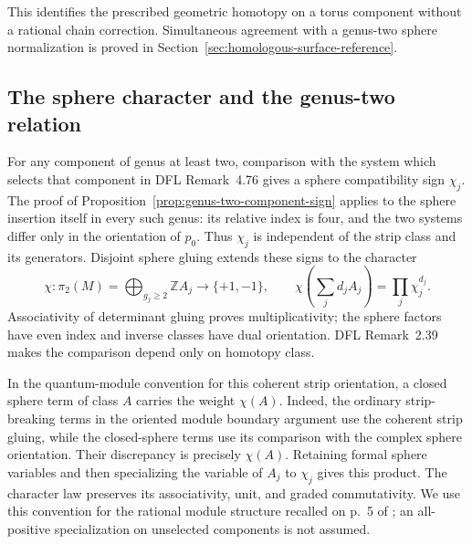 \documentclass[11pt]{amsart}
\theoremstyle{definition}
\theoremstyle{remark}
\theoremstyle{plain}
\begin{document}
This identifies the prescribed geometric homotopy on a
torus component without a rational chain correction.
Simultaneous agreement with a genus-two sphere normalization
is proved in Section~\ref{sec:homologous-surface-reference}.

\subsection{The sphere character and the genus-two relation}
\label{sec:sphere-character-quantum-relation}

For any component of genus at least two, comparison
with the system which selects that component in
DFL Remark~4.76 gives a sphere compatibility sign
$\chi_j$. The proof of
Proposition~\ref{prop:genus-two-component-sign}
applies to the sphere insertion itself in every
such genus: its relative index is four, and the
two systems differ only in the orientation of
$p_0$. Thus $\chi_j$ is independent of the strip
class and its generators. Disjoint sphere gluing
extends these signs to the character
\[
 \chi:\pi_2(M)=\bigoplus_{g_j\ge2}\mathbb Z A_j
      \longrightarrow\{+1,-1\},\qquad
 \chi\!\left(\sum_j d_j A_j\right)=\prod_j\chi_j^{d_j}.
\]
Associativity of determinant gluing proves
multiplicativity; the sphere factors have
even index and inverse classes have dual
orientation. DFL Remark~2.39 makes the
comparison depend only on homotopy class.

In the quantum-module convention for this
coherent strip orientation, a closed sphere
term of class $A$ carries the weight $\chi(A)$.
Indeed, the ordinary strip-breaking terms
in the oriented module boundary argument
use the coherent strip gluing, while the
closed-sphere terms use its comparison with
the complex sphere orientation. Their
discrepancy is precisely $\chi(A)$.
Retaining formal sphere variables and then
specializing the variable of $A_j$ to
$\chi_j$ gives this product. The character
law preserves its associativity, unit,
and graded commutativity. We use this
convention for the rational module structure
recalled on p.~5 of \cite{DaeFukLip21a};
an all-positive specialization on unselected
components is not assumed.
\end{document}
